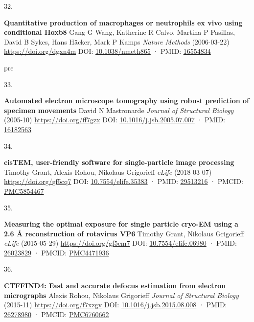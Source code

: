 \documentclass[
]{article}
\newlength{\cslhangindent}
\newlength{\csllabelwidth}
\newlength{\cslentryspacingunit} %
\newenvironment{CSLReferences}[2] %
 {%
  \setlength{\parindent}{0pt}
  \ifodd #1
  \let\oldpar\par
  \def\par{\hangindent=\cslhangindent\oldpar}
  \fi
  \setlength{\parskip}{#2\cslentryspacingunit}
 }%
 {}
\newcommand{\CSLBlock}[1]{#1\hfill\break}
\newcommand{\CSLLeftMargin}[1]{\parbox[t]{\csllabelwidth}{#1}}
\newcommand{\CSLRightInline}[1]{\parbox[t]{\linewidth - \csllabelwidth}{#1}\break}
\providecommand{\DIFaddtex}[1]{{\protect\color{blue}\uwave{#1}}} %
\providecommand{\DIFaddbegin}{} %
\providecommand{\DIFaddend}{} %
\providecommand{\DIFdelbegin}{} %
\providecommand{\DIFdelend}{} %
\providecommand{\DIFadd}[1]{\texorpdfstring{\DIFaddtex{#1}}{#1}} %
\newcommand{\DIFscaledelfig}{0.5}
\newlength{\DIFdelgraphicswidth} %
\newlength{\DIFdelgraphicsheight} %
\newcommand{\DIFaddincludegraphics}[2][]{{\color{blue}\fbox{\DIFOincludegraphics[#1]{#2}}}} %
\newcommand{\DIFdelincludegraphics}[2][]{%
\sbox{\DIFdelgraphicsbox}{\DIFOincludegraphics[#1]{#2}}%
\settoboxwidth{\DIFdelgraphicswidth}{\DIFdelgraphicsbox} %
\settoboxtotalheight{\DIFdelgraphicsheight}{\DIFdelgraphicsbox} %
\scalebox{\DIFscaledelfig}{%
\parbox[b]{\DIFdelgraphicswidth}{\usebox{\DIFdelgraphicsbox}\\[-\baselineskip] \rule{\DIFdelgraphicswidth}{0em}}\llap{\resizebox{\DIFdelgraphicswidth}{\DIFdelgraphicsheight}{%
\setlength{\unitlength}{\DIFdelgraphicswidth}%
\begin{picture}(1,1)%
\thicklines\linethickness{2pt} %
{\color[rgb]{1,0,0}\put(0,0){\framebox(1,1){}}}%
{\color[rgb]{1,0,0}\put(0,0){\line( 1,1){1}}}%
{\color[rgb]{1,0,0}\put(0,1){\line(1,-1){1}}}%
\end{picture}%
}\hspace*{3pt}}} %
} %
\DeclareRobustCommand{\DIFaddbegin}{\DIFOaddbegin \let\includegraphics\DIFaddincludegraphics} %
\DeclareRobustCommand{\DIFaddend}{\DIFOaddend \let\includegraphics\DIFOincludegraphics} %
\DeclareRobustCommand{\DIFdelbegin}{\DIFOdelbegin \let\includegraphics\DIFdelincludegraphics} %
\DeclareRobustCommand{\DIFdelend}{\DIFOaddend \let\includegraphics\DIFOincludegraphics} %
\begin{document}
\begin{CSLReferences}{0}{0}
\leavevmode\vadjust pre{\DIFaddbegin \hypertarget{ref-nSMAxqTD}{}}%
\CSLLeftMargin{32. }%
\CSLRightInline{\textbf{Quantitative production of macrophages or neutrophils ex vivo using conditional Hoxb8}
\CSLBlock{Gang G Wang, Katherine R Calvo, Martina P Pasillas, David B Sykes, Hans Häcker, Mark P Kamps} \emph{Nature Methods} (2006-03-22) \url{https://doi.org/dgxn4m}
\CSLBlock{DOI: \href{https://doi.org/10.1038/nmeth865}{10.1038/nmeth865} · PMID: \href{https://www.ncbi.nlm.nih.gov/pubmed/16554834}{16554834}}}

\leavevmode\vadjust \DIFadd{pre}{\DIFaddend \hypertarget{ref-19ZFerhph}{}}%
\DIFdelbegin %
\DIFdelend \DIFaddbegin \CSLLeftMargin{33. }\DIFaddend %
\CSLRightInline{\textbf{Automated electron microscope tomography using robust prediction of specimen movements}
\CSLBlock{David N Mastronarde} \emph{Journal of Structural Biology} (2005-10) \url{https://doi.org/ff7gzx}
\CSLBlock{DOI: \href{https://doi.org/10.1016/j.jsb.2005.07.007}{10.1016/j.jsb.2005.07.007} · PMID: \href{https://www.ncbi.nlm.nih.gov/pubmed/16182563}{16182563}}}

\leavevmode{}%
\DIFdelbegin %
\DIFdelend \DIFaddbegin \CSLLeftMargin{34. }\DIFaddend %
\CSLRightInline{\textbf{cisTEM, user-friendly software for single-particle image processing}
\CSLBlock{Timothy Grant, Alexis Rohou, Nikolaus Grigorieff} \emph{eLife} (2018-03-07) \url{https://doi.org/gf5cq7}
\CSLBlock{DOI: \href{https://doi.org/10.7554/elife.35383}{10.7554/elife.35383} · PMID: \href{https://www.ncbi.nlm.nih.gov/pubmed/29513216}{29513216} · PMCID: \href{https://www.ncbi.nlm.nih.gov/pmc/articles/PMC5854467}{PMC5854467}}}

\leavevmode{}%
\DIFdelbegin %
\DIFdelend \DIFaddbegin \CSLLeftMargin{35. }\DIFaddend %
\CSLRightInline{\textbf{Measuring the optimal exposure for single particle cryo-EM using a 2.6 Å reconstruction of rotavirus VP6}
\CSLBlock{Timothy Grant, Nikolaus Grigorieff} \emph{eLife} (2015-05-29) \url{https://doi.org/gf5cm7}
\CSLBlock{DOI: \href{https://doi.org/10.7554/elife.06980}{10.7554/elife.06980} · PMID: \href{https://www.ncbi.nlm.nih.gov/pubmed/26023829}{26023829} · PMCID: \href{https://www.ncbi.nlm.nih.gov/pmc/articles/PMC4471936}{PMC4471936}}}

\leavevmode{}%
\DIFdelbegin %
\DIFdelend \DIFaddbegin \CSLLeftMargin{36. }\DIFaddend %
\CSLRightInline{\textbf{CTFFIND4: Fast and accurate defocus estimation from electron micrographs}
\CSLBlock{Alexis Rohou, Nikolaus Grigorieff} \emph{Journal of Structural Biology} (2015-11) \url{https://doi.org/f7xzgv}
\CSLBlock{DOI: \href{https://doi.org/10.1016/j.jsb.2015.08.008}{10.1016/j.jsb.2015.08.008} · PMID: \href{https://www.ncbi.nlm.nih.gov/pubmed/26278980}{26278980} · PMCID: \href{https://www.ncbi.nlm.nih.gov/pmc/articles/PMC6760662}{PMC6760662}}}


\end{CSLReferences}
\end{document}
